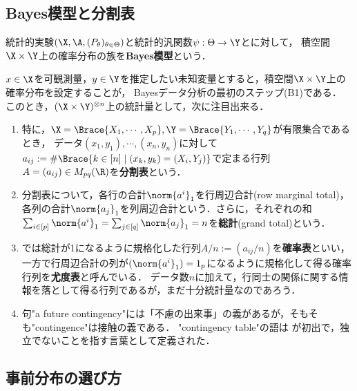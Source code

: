 \documentclass[uplatex,dvipdfmx]{jsreport}
\begin{document}
\subsection{Bayes模型と分割表}

\begin{definition}
    統計的実験$(\X,\A,(P_\theta)_{\theta\in\Theta})$と統計的汎関数$\psi:\Theta\to\Y$とに対して，
    積空間$\X\times\Y$上の確率分布の族を\textbf{Bayes模型}という．
\end{definition}

\begin{example}
    $x\in\X$を可観測量，$y\in\Y$を推定したい未知変量とすると，積空間$\X\times\Y$上の確率分布を設定することが，
    Bayesデータ分析の最初のステップ(B1)である．
    このとき，$(\X\times\Y)^{\otimes n}$上の統計量として，次に注目出来る．
    \begin{enumerate}
        \item 特に，$\X=\Brace{X_1,\cdots,X_p},\Y=\Brace{Y_1,\cdots,Y_q}$が有限集合であるとき，
        データ$(x_1,y_1),\cdots,(x_n,y_n)$に対して
        $a_{ij}:=\#\Brace{k\in[n]\mid(x_k,y_k)=(X_i,Y_j)}$で定まる行列$A=(a_{ij})\in M_{pq}(\R)$を\textbf{分割表}という．
        \item 分割表について，各行の合計$\norm{a^i}_1$を行周辺合計(row marginal total)，各列の合計$\norm{a_j}_1$を列周辺合計という．さらに，それぞれの和$\sum_{i\in[p]}\norm{a^i}_1=\sum_{j\in[q]}\norm{a_j}_1=n$を\textbf{総計}(grand total)という．
        \item \cite{鎌谷-モンテカルロ} では総計が1になるように規格化した行列$A/n:=(a_{ij}/n)$を\textbf{確率表}といい，一方で行周辺合計の列が$(\norm{a^i}_1)=1_p$になるように規格化して得る確率行列を\textbf{尤度表}と呼んでいる．
        データ数$n$に加えて，行同士の関係に関する情報を落として得る行列であるが，まだ十分統計量なのであろう．
        \item 句"a future contingency"には「不慮の出来事」の義があるが，そもそも"contingence"は接触の義である．
        "contingency table"の語は \cite{Pearson04} が初出で，独立でないことを指す言葉として定義された．
    \end{enumerate}
\end{example}

\subsection{事前分布の選び方}
\end{document}
